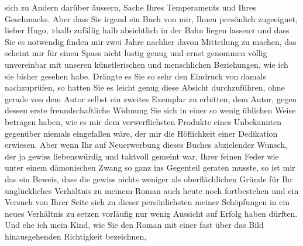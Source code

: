 \begin{ledgroupsized}[t]{13cm}
               sich zu Andern darüber äussern, Sache Ihres Temperaments und Ihres Geschmacks. Aber
               dass Sie irgend ein Buch von mir, Ihnen persönlich zugeeignet, lieber Hugo, »halb
               zufällig halb absichtlich in der Bahn liegen lassen« und dass Sie es notwendig finden
               mir zwei Jahre nachher  davon Mitteilung zu
               machen, das scheint mir für einen Spass nicht lustig genug und ernst genommen völlig
               unvereinbar mit unseren künstlerischen und menschlichen Beziehungen, wie ich sie
               bisher gesehen habe. Drängte es Sie so sehr den Eindruck von damals nachzuprüfen, so
               hatten Sie es leicht genug diese Absicht durchzuführen, ohne gerade von dem Autor
               selbst ein zweites Exemplar zu erbitten, dem Autor, gegen dessen erste
               freundschaftliche Widmung Sie sich in einer so wenig üblichen Weise betragen haben,
               wie es mir dem verwerflichsten Produkte eines Unbekannten gegenüber niemals einge{\pb}fallen wäre, der mir die Höflichkeit einer Dedikation
               erwiesen. Aber wenn Ihr auf Neuerwerbung dieses Buches abzielender Wunsch, der ja gewiss liebenswürdig und
               taktvoll gemeint war, Ihrer feinen Feder wie unter einem dämonischen Zwang so ganz
               ins Gegenteil geraten musste, so ist mir das ein Beweis, dass die gewiss nichts
               weniger als oberflächlichen Gründe für Ihr unglückliches Verhältnis zu meinem Roman auch heute noch
               fortbestehen und ein Versuch von Ihrer Seite sich zu dieser persönlichsten meiner
               Schöpfungen in ein neues Verhältnis zu setzen vorläufig nur wenig Aussicht auf Erfolg
               haben dürften. Und ehe ich mein Kind, wie Sie den Roman mit einer fast über das Bild hinausgehenden Richtigkeit bezeichnen,

\end{ledgroupsized}

